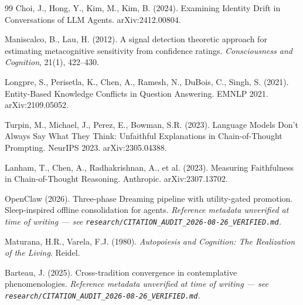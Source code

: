 \documentclass[11pt]{article}
\begin{document}
\begin{thebibliography}{99}
Choi, J., Hong, Y., Kim, M., Kim, B. (2024).
Examining Identity Drift in Conversations of LLM Agents. arXiv:2412.00804.

Maniscalco, B., Lau, H. (2012).
A signal detection theoretic approach for estimating metacognitive
sensitivity from confidence ratings. \emph{Consciousness and Cognition},
21(1), 422--430.

Longpre, S., Perisetla, K., Chen, A., Ramesh, N., DuBois, C., Singh, S. (2021).
Entity-Based Knowledge Conflicts in Question Answering. EMNLP 2021.
arXiv:2109.05052.

Turpin, M., Michael, J., Perez, E., Bowman, S.R. (2023).
Language Models Don't Always Say What They Think: Unfaithful Explanations in
Chain-of-Thought Prompting. NeurIPS 2023. arXiv:2305.04388.

Lanham, T., Chen, A., Radhakrishnan, A., et al. (2023).
Measuring Faithfulness in Chain-of-Thought Reasoning. Anthropic.
arXiv:2307.13702.

OpenClaw (2026). Three-phase Dreaming pipeline with utility-gated promotion.
Sleep-inspired offline consolidation for agents.
\emph{Reference metadata unverified at time of writing --- see
\texttt{research/CITATION\_AUDIT\_2026-08-26\_VERIFIED.md}.}

Maturana, H.R., Varela, F.J. (1980).
\emph{Autopoiesis and Cognition: The Realization of the Living}. Reidel.

Barteau, J. (2025). Cross-tradition convergence in contemplative
phenomenologies.
\emph{Reference metadata unverified at time of writing --- see
\texttt{research/CITATION\_AUDIT\_2026-08-26\_VERIFIED.md}.}

\end{thebibliography}
\end{document}
